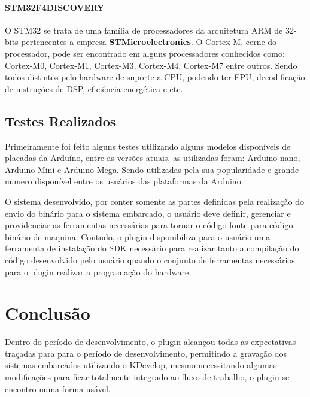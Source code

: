 
\subsubsection{STM32F4DISCOVERY}

O STM32 se trata de uma família de processadores da arquitetura ARM de 32-bits pertencentes a empresa \textbf{STMicroelectronics}. O Cortex-M, cerne do processador, pode ser encontrado em alguns processadores conhecidos como: Cortex-M0, Cortex-M1, Cortex-M3, Cortex-M4, Cortex-M7 entre outros. Sendo todos distintos pelo hardware de suporte a CPU, podendo ter FPU, decodificação de instruções de DSP, eficiência energética e etc.


\section{Testes Realizados}

Primeiramente foi feito alguns testes utilizando alguns modelos disponíveis de placadas da Arduíno, entre as versões atuais, as utilizadas foram: Arduino nano, Arduino Mini e Arduino Mega. Sendo utilizadas pela sua popularidade e grande numero disponível entre os usuários das plataformas da Arduino.

O sistema desenvolvido, por conter somente as partes definidas pela realização do envio do binário para o sistema embarcado, o usuário deve definir, gerenciar e providenciar as ferramentas necessárias para tornar o código fonte para código binário de maquina. Contudo, o plugin disponibiliza para o usuário uma ferramenta de instalação do SDK necessário para realizar tanto a compilação do código desenvolvido pelo usuário quando o conjunto de ferramentas necessários para o plugin realizar a programação do hardware.

\chapter{Conclusão}
Dentro do período de desenvolvimento, o plugin alcançou todas as expectativas traçadas para para o período de desenvolvimento,
permitindo a gravação dos sistemas embarcados utilizando o KDevelop, mesmo necessitando algumas modificações para ficar
totalmente integrado ao fluxo de trabalho, o plugin se encontro numa forma usável.

